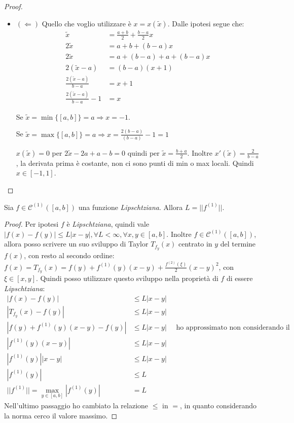 \begin{proof}
\begin{itemize}
	 \item $(\Leftarrow)$ Quello che voglio utilizzare \`e $x =
	  x(\tilde{x})$. Dalle ipotesi segue che:
	 \begin{displaymath}
	 \begin{split}
	 	\tilde{x} &= \frac{a+b}{2} + \frac{b-a}{2}x \\
	 	2\tilde{x} &= a + b + (b-a) x \\
	 	2\tilde{x} &= a + (b -a) +a +(b-a)x \\
	 	2(\tilde{x} -a) &= (b-a)(x+1) \\
	 	\frac{2(\tilde{x} -a)}{b-a} &= x+1 \\
	 	\frac{2(\tilde{x} -a)}{b-a} -1 &= x
	 \end{split}
	 \end{displaymath}
	 
	 Se $\tilde{x} = \min\{[a,b]\} = a \Rightarrow x = -1$.
	 
	 Se $\tilde{x} = \max\{[a,b]\} = a \Rightarrow x = \frac{2(b-a)}{(b-a)}-1 = 1$
	 
	 $x(\tilde{x}) = 0$ per $2\tilde{x} -2a + a -b = 0$ quindi per $\tilde{x} =
	 \frac{b+a}{2}$. Inoltre $x'(\tilde{x}) = \frac{2}{b-a}$, la derivata prima \`e
	 costante, non ci sono punti di min o max locali. Quindi $x \in [-1,1]$.
	\end{itemize}
\end{proof}

\begin{exercise}
Sia $f \in \mathcal{C}^{(1)}([a,b])$ una funzione \emph{Lipschtziana}. Allora $L
= ||f^{(1)}||$.
\end{exercise}
\begin{proof}
Per ipotesi $f$ \`e \emph{Lipschtziana}, quindi vale $|f(x) - f(y)| \leq
L|x-y|, \forall L < \infty, \forall x,y \in [a,b]$. Inoltre $f \in
\mathcal{C}^{(1)}([a,b])$, allora posso scrivere un suo sviluppo di Taylor
$T_{f_{y}}(x)$ centrato in $y$ del termine $f(x)$, con resto al secondo ordine: 
$f(x) = T_{f_{y}}(x) = f(y) + f^{(1)}(y)(x-y) +
\frac{f^{(2)}(\xi)}{2}(x-y)^{2}$, con $\xi \in [x,y]$. Quindi posso utilizzare
questo sviluppo nella propriet\`a di $f$ di essere  \emph{Lipschtziana}:
\begin{displaymath}
\begin{split}
	|f(x) - f(y)| &\leq L|x-y| \\
	|T_{f_{y}}(x) - f(y)| &\leq L|x-y| \\
	|f(y) + f^{(1)}(y)(x-y) - f(y)| &\leq L|x-y| \quad \text{ ho approssimato non
	considerando il resto} \\
	|f^{(1)}(y)(x-y)| &\leq L|x-y| \\
	|f^{(1)}(y)| |x-y| &\leq L|x-y| \\
	|f^{(1)}(y)| &\leq L \\
	||f^{(1)}|| = \max_{y \in [a,b]}{|f^{(1)}(y)|} &= L 
\end{split}
\end{displaymath}
Nell'ultimo passaggio ho cambiato la relazione $\leq$ in $=$, in quanto
considerando la norma cerco il valore massimo.
\end{proof}


